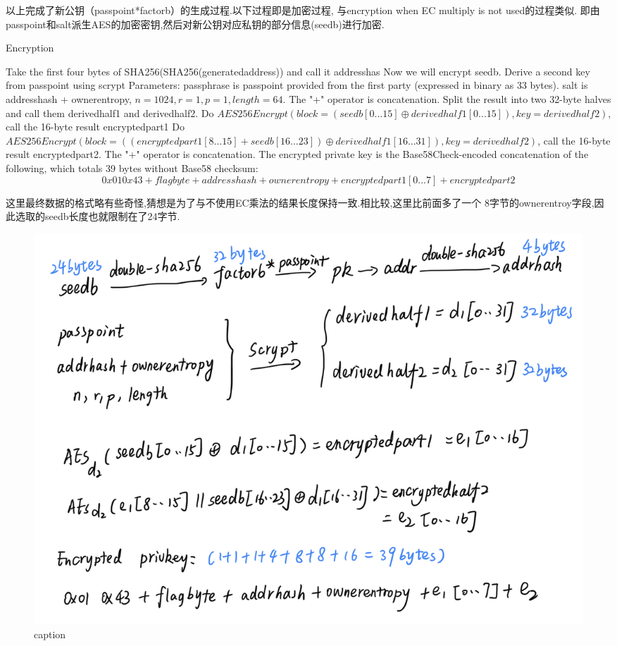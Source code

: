 以上完成了新公钥（passpoint*factorb）的生成过程.以下过程即是加密过程,
与encryption when EC multiply is not used的过程类似.
即由passpoint和salt派生AES的加密密钥,然后对新公钥对应私钥的部分信息(seedb)进行加密.

\begin{algorithm}[tbp]\footnotesize
\caption{Encryption}
  	\begin{algorithmic}[1]
	    \STATE Take the first four bytes of SHA256(SHA256(generatedaddress)) 
	    and call it addresshas
	    \STATE Now we will encrypt seedb. Derive a second key from passpoint 
	    using scrypt 
		\STATE Parameters: passphrase is passpoint provided from the first 
		party (expressed in binary as 33 bytes). 
		salt is addresshash + ownerentropy, $n=1024, r=1, p=1, length=64$. 
		The "+" operator is concatenation.
		\STATE Split the result into two 32-byte halves and call them derivedhalf1 
		and derivedhalf2.
		\STATE Do $AES256Encrypt(block = (seedb[0...15] \oplus derivedhalf1[0...15]), 
		key = derivedhalf2)$, call the 16-byte result encryptedpart1
		\STATE Do $AES256Encrypt(block = ((encryptedpart1[8...15] + seedb[16...23]) 
		\oplus derivedhalf1[16...31]), key = derivedhalf2)$, call the 16-byte result 
		encryptedpart2. The "+" operator is concatenation.
		\STATE The encrypted private key is the Base58Check-encoded concatenation of 
		the following, which totals 39 bytes without Base58 checksum: 
		$$0x01 0x43 + flagbyte + addresshash + ownerentropy +  encryptedpart1[0...7] + 
		encryptedpart2$$
    \end{algorithmic}
\end{algorithm}

这里最终数据的格式略有些奇怪,猜想是为了与不使用EC乘法的结果长度保持一致.相比较,这里比前面多了一个
8字节的ownerentroy字段,因此选取的seedb长度也就限制在了24字节.

\begin{figure}[h]
\centering
\includegraphics[width=.7\textwidth]{./ec.png}
\caption{caption}\label{fig-parsesig}
\end{figure}

